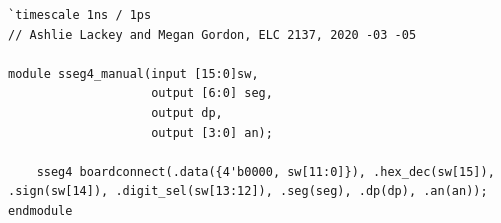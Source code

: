 \documentclass[11pt]{article}
\begin{document}
\begin{lstlisting}[style=Verilog,caption=sseg4 manual Module Code,label=code:ex ]
`timescale 1ns / 1ps
// Ashlie Lackey and Megan Gordon, ELC 2137, 2020 -03 -05

module sseg4_manual(input [15:0]sw,
					output [6:0] seg,
					output dp,
					output [3:0] an);
	
	sseg4 boardconnect(.data({4'b0000, sw[11:0]}), .hex_dec(sw[15]), .sign(sw[14]), .digit_sel(sw[13:12]), .seg(seg), .dp(dp), .an(an));              
endmodule
\end{lstlisting}
\end{document}

